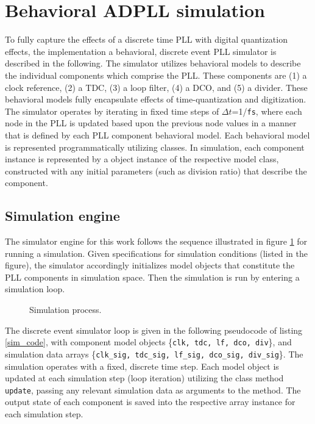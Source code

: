 \pagebreak
\section{Behavioral ADPLL simulation}
To fully capture the effects of a discrete time PLL with digital quantization effects, the implementation a behavioral, discrete event PLL simulator is described in the following. The simulator utilizes behavioral models to describe the individual components which comprise the PLL. These components are (1) a clock reference, (2) a TDC, (3) a loop filter, (4) a DCO, and (5) a divider. These behavioral models fully encapsulate effects of time-quantization and digitization. The simulator operates by iterating in fixed time steps of $\Delta t$=1/\texttt{fs}, where each node in the PLL is updated based upon the previous node values in a manner that is defined by each PLL component behavioral model. Each behavioral model is represented programmatically utilizing classes. In simulation, each component instance is represented by a object instance of the respective model class, constructed with any initial parameters (such as division ratio) that describe the component.
\subsection{Simulation engine}
The simulator engine for this work follows the sequence illustrated in figure \ref{fig:simulator} for running a simulation. Given specifications for simulation conditions (listed in the figure), the simulator accordingly initializes model objects that constitute the PLL components in simulation space. Then the simulation is run by entering a simulation loop. 
\begin{figure}[htb!]
	\center
	\caption{Simulation process.}
	\label{fig:simulator}
\end{figure}
\FloatBarrier
The discrete event simulator loop is given in the following pseudocode of listing \ref{sim_code}, with component model objects \{\texttt{clk, tdc, lf, dco, div}\}, and simulation data arrays \{\texttt{clk\_sig, tdc\_sig, lf\_sig, dco\_sig, div\_sig}\}. The simulation operates with a fixed, discrete time step. Each model object is updated at each simulation step (loop iteration) utilizing the class method \texttt{update}, passing any relevant simulation data as arguments to the method. The output state of each component is saved into the respective array instance for each simulation step. 

